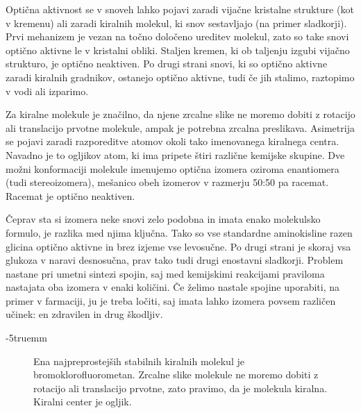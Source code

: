 \begin{remark}
Optična aktivnost se v snoveh lahko pojavi zaradi vijačne kristalne strukture
(kot v kremenu) ali zaradi kiralnih molekul, ki snov sestavljajo (na primer sladkorji). 
Prvi mehanizem je vezan na točno določeno ureditev molekul, zato so 
take snovi optično aktivne le v kristalni obliki. Staljen kremen, ki ob taljenju
izgubi vijačno strukturo, je optično neaktiven. Po drugi strani snovi, ki so 
optično aktivne zaradi kiralnih gradnikov, ostanejo optično aktivne, tudi 
če jih stalimo, raztopimo v vodi ali izparimo.

Za kiralne molekule je značilno, da njene zrcalne slike ne moremo dobiti z rotacijo
ali translacijo prvotne molekule, ampak je potrebna zrcalna preslikava. Asimetrija 
se pojavi zaradi razporeditve atomov okoli tako imenovanega kiralnega centra. Navadno
je to ogljikov atom, ki ima pripete štiri različne kemijske skupine.
Dve možni konformaciji molekule imenujemo optična izomera 
oziroma enantiomera (tudi stereoizomera), mešanico obeh izomerov v razmerju 50:50 pa
racemat. Racemat je optično neaktiven.

Čeprav sta si izomera neke snovi zelo podobna in imata enako molekulsko formulo, 
je razlika med njima ključna. Tako so vse standardne aminokisline razen
glicina optično aktivne in brez izjeme vse levosučne. Po drugi strani je skoraj 
vsa glukoza v naravi desnosučna, prav tako tudi drugi enostavni sladkorji. Problem
nastane pri umetni sintezi spojin, saj med kemijskimi reakcijami praviloma
nastajata oba izomera v enaki količini. Če želimo nastale spojine uporabiti, na
primer v farmaciji, ju je treba ločiti, saj imata lahko izomera povsem različen
učinek: en zdravilen in drug škodljiv.
\end{remark}
\vglue-5truemm
\begin{figure}[h]
\centering
\def\svgwidth{60truemm} 

\caption{Ena najpreprostejših stabilnih kiralnih molekul je bromoklorofluorometan. Zrcalne
slike molekule ne moremo dobiti z rotacijo ali translacijo prvotne, zato pravimo, 
da je molekula kiralna. Kiralni center je ogljik.}
\label{fig:09_kiralna}
\end{figure}

